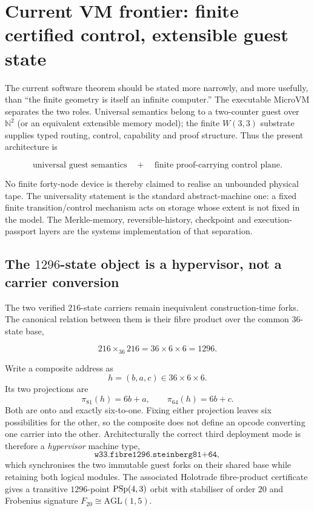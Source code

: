 
\section*{Current VM frontier: finite certified control, extensible guest state}

The current software theorem should be stated more narrowly, and more usefully, than
``the finite geometry is itself an infinite computer.''  The executable MicroVM separates
the two roles.  Universal semantics belong to a two-counter guest over $\mathbb N^2$ (or
an equivalent extensible memory model); the finite $W(3,3)$ substrate supplies typed
routing, control, capability and proof structure.  Thus the present architecture is

\[
\boxed{
\text{universal guest semantics}
\quad+\quad
\text{finite proof-carrying control plane}.
}
\]

No finite forty-node device is thereby claimed to realise an unbounded physical tape.
The universality statement is the standard abstract-machine one: a fixed finite
transition/control mechanism acts on storage whose extent is not fixed in the model.
The Merkle-memory, reversible-history, checkpoint and execution-passport layers are the
systems implementation of that separation.

\subsection*{The $1296$-state object is a hypervisor, not a carrier conversion}

The two verified $216$-state carriers remain inequivalent construction-time forks.  The
canonical relation between them is their fibre product over the common $36$-state base,

\[
\boxed{
216\times_{36}216=36\times6\times6=1296.
}
\]

Write a composite address as
\[
h=(b,a,c)\in 36\times6\times6.
\]
Its two projections are
\[
\pi_{81}(h)=6b+a,
\qquad
\pi_{64}(h)=6b+c.
\]
Both are onto and exactly six-to-one.  Fixing either projection leaves six possibilities
for the other, so the composite does not define an opcode converting one carrier into the
other.  Architecturally the correct third deployment mode is therefore a
\emph{hypervisor} machine type,
\[
\texttt{w33.fibre1296.steinberg81+64},
\]
which synchronises the two immutable guest forks on their shared base while retaining
both logical modules.  The associated Holotrade fibre-product certificate gives a
transitive $1296$-point $\mathrm{PSp}(4,3)$ orbit with stabiliser of order $20$ and Frobenius
signature $F_{20}\cong\mathrm{AGL}(1,5)$.

